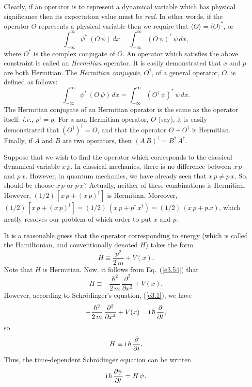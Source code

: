 Clearly, if an operator is to represent a dynamical variable which has
physical significance then its expectation value must be {\em real}. 
In other words, if the operator $O$ represents a physical variable
then we require that $\langle O\rangle = \langle O \rangle^\ast$, or
\begin{equation}\label{e3.55a}
\int_{-\infty}^{\infty} \psi^\ast\,(O\,\psi)\,dx = \int_{-\infty}^{\infty}(O\,\psi)^\ast\,\psi\,dx,
\end{equation}
where $O^\ast$ is the complex conjugate of $O$. An operator which
satisfies the above constraint is called an {\em Hermitian}\/ operator. 
It is easily demonstrated that $x$ and $p$ are both Hermitian.
The {\em Hermitian conjugate}, $O^\dag$, of
a general operator, $O$, is defined as follows:
\begin{equation}\label{e5.48}
\int_{-\infty}^{\infty} \psi^{\ast} \,(O\,\psi)\,dx=\int_{-\infty}^\infty
(O^\dag\,\psi)^\ast\,\psi\,dx.
\end{equation}
The Hermitian conjugate of an Hermitian operator is the same as the operator
itself: {\em i.e.}, $p^\dag = p$. For a non-Hermitian operator, $O$ (say),
it is easily demonstrated that $(O^\dag)^\dag=O$, and that the operator $O+O^\dag$ is Hermitian. 
Finally, if $A$ and $B$ are two operators, then $(A\,B)^\dag = B^\dag\,A^\dag$. 

Suppose that we wish to find the operator which corresponds to the
classical dynamical variable $x\,p$. In classical mechanics, there
is no difference between $x\,p$ and $p\,x$. However, in quantum
mechanics, we have already seen that $x\,p\neq p\,x$. So,
should be choose $x\,p$ or $p\,x$? Actually, neither of these combinations
is Hermitian. However, $(1/2)\,[x\,p + (x\,p)^\dag]$ is Hermitian. 
Moreover, $(1/2)\,[x\,p + (x\,p)^\dag]=(1/2)\,(x\,p+p^\dag\,x^\dag)=(1/2)\,(x\,p+p\,x)$, which neatly resolves
our problem of which order to put $x$ and $p$. 

It is a reasonable guess that the operator corresponding to energy (which is
called the Hamiltonian, and conventionally denoted $H$) takes the form
\begin{equation}
H \equiv \frac{p^2}{2\,m} + V(x).
\end{equation}
Note that $H$ is Hermitian. Now, it follows from Eq.~(\ref{e3.54}) that
\begin{equation}
H \equiv -\frac{\hbar^2}{2\,m}\,\frac{\partial^2}{\partial x^2} + V(x).
\end{equation}
However, according to Schr\"{o}dinger's equation, (\ref{e3.1}), we have
\begin{equation}
-\frac{\hbar^2}{2\,m}\,\frac{\partial^2}{\partial x^2} + V(x) = {\rm i}\,\hbar\,\frac{\partial}{\partial t},
\end{equation}
so
\begin{equation}
H \equiv {\rm i}\,\hbar\,\frac{\partial}{\partial t}.
\end{equation}
Thus, the time-dependent Schr\"{o}dinger equation can be written
\begin{equation}\label{etimed}
{\rm i}\,\hbar\,\frac{\partial\psi}{\partial t} = H\,\psi.
\end{equation}

